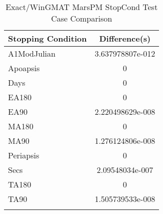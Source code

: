 \begin{table}[htbp!]
\centering
\caption{ Exact/WinGMAT MarsPM StopCond Test Case Comparison}
      \begin{tabular}{lc}
      \hline\hline
          Stopping Condition & Difference(s) \\
         \hline
         A1ModJulian & 3.637978807e-012 \\
         Apoapsis & 0 \\
         Days & 0 \\
         EA180 & 0 \\
         EA90 & 2.220498629e-008 \\
         MA180 & 0 \\
         MA90 & 1.276124806e-008 \\
         Periapsis & 0 \\
         Secs & 2.09548034e-007 \\
         TA180 & 0 \\
         TA90 & 1.505739533e-008 \\
      \hline\hline
      \label{Table: Exact-WinGMAT MarsPM StopCond Table} 
\end{tabular}
\end{table}
